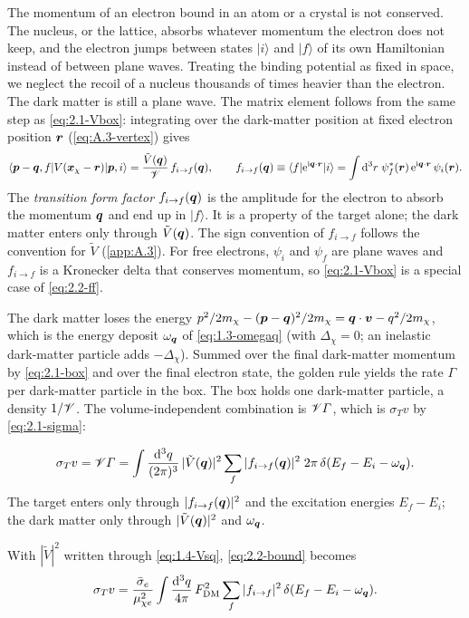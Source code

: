 The momentum of an electron bound in an atom or a crystal is not conserved. The nucleus, or the lattice, absorbs whatever momentum the electron does not keep, and the electron jumps between states $|i\rangle$ and $|f\rangle$ of its own Hamiltonian instead of between plane waves. Treating the binding potential as fixed in space, we neglect the recoil of a nucleus thousands of times heavier than the electron. The dark matter is still a plane wave. The matrix element follows from the same step as \cref{eq:2.1-Vbox}: integrating over the dark-matter position at fixed electron position $\bm{r}$ (\cref{eq:A.3-vertex}) gives
\begin{equation}
  \langle\bm{p} - \bm{q}, f|V(\bm{x}_\chi - \bm{r})|\bm{p}, i\rangle = \frac{\tilde V(\bm{q})}{\mathscr{V}}\,f_{i\to f}(\bm{q}),
  \qquad
  f_{i\to f}(\bm{q}) \equiv \langle f|\mathrm{e}^{\mathrm{i}\bm{q}\cdot\bm{r}}|i\rangle = \int\mathrm{d}^3r\;\psi_f^*(\bm{r})\,\mathrm{e}^{\mathrm{i}\bm{q}\cdot\bm{r}}\,\psi_i(\bm{r}) .
  \label{eq:2.2-ff}
\end{equation}
The \emph{transition form factor} $f_{i\to f}(\bm{q})$ is the amplitude for the electron to absorb the momentum $\bm{q}$ and end up in $|f\rangle$. It is a property of the target alone; the dark matter enters only through $\tilde V(\bm{q})$. The sign convention of $f_{i\to f}$ follows the convention for $\tilde V$ (\cref{app:A.3}). For free electrons, $\psi_i$ and $\psi_f$ are plane waves and $f_{i\to f}$ is a Kronecker delta that conserves momentum, so \cref{eq:2.1-Vbox} is a special case of \cref{eq:2.2-ff}.

The dark matter loses the energy $p^2/2m_\chi - (\bm{p} - \bm{q})^2/2m_\chi = \bm{q}\cdot\bm{v} - q^2/2m_\chi$, which is the energy deposit $\omega_{\bm{q}}$ of \cref{eq:1.3-omegaq} (with $\Delta_\chi = 0$; an inelastic dark-matter particle adds $-\Delta_\chi$). Summed over the final dark-matter momentum by \cref{eq:2.1-box} and over the final electron state, the golden rule yields the rate $\varGamma$ per dark-matter particle in the box. The box holds one dark-matter particle, a density $1/\mathscr{V}$. The volume-independent combination is $\mathscr{V}\varGamma$, which is $\sigma_T v$ by \cref{eq:2.1-sigma}:
\begin{keyresult}
\begin{equation}
  \sigma_T v = \mathscr{V}\varGamma = \int\frac{\mathrm{d}^3q}{(2\pi)^3}\,|\tilde V(\bm{q})|^2\sum_f|f_{i\to f}(\bm{q})|^2\;2\pi\,\delta(E_f - E_i - \omega_{\bm{q}}) .
  \label{eq:2.2-bound}
\end{equation}
The target enters only through $|f_{i\to f}(\bm{q})|^2$ and the excitation energies $E_f - E_i$; the dark matter only through $|\tilde V(\bm{q})|^2$ and $\omega_{\bm{q}}$.
\end{keyresult}
\noindent With $|\tilde V|^2$ written through \cref{eq:1.4-Vsq}, \cref{eq:2.2-bound} becomes~\cite[Eqs.~(3.9) and (3.10)]{essig2016direct}
\begin{equation*}
  \sigma_T v = \frac{\bar{\sigma}_{e}}{\mu_{\chi e}^2}\int\frac{\mathrm{d}^3q}{4\pi}\,F_{\mathrm{DM}}^2\sum_f|f_{i\to f}|^2\,\delta(E_f - E_i - \omega_{\bm{q}}) .
\end{equation*}

